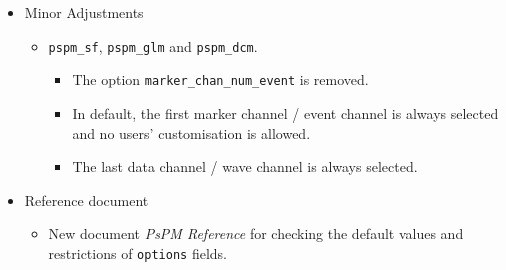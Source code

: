 \documentclass[english]{article}
\numberwithin{equation}{section}
\numberwithin{figure}{section}
\begin{document}
\begin{itemize}
    \item Minor Adjustments
    \begin{itemize}
    	\item \texttt{pspm\_sf}, \texttt{pspm\_glm} and \texttt{pspm\_dcm}.
    	\begin{itemize}
    		\item The option \texttt{marker\_chan\_num\_event} is removed.
    		\item In default, the first marker channel / event channel is always selected and no users' customisation is allowed.
    		\item The last data channel / wave channel is always selected.
    	\end{itemize}
    \end{itemize}
    \item Reference document
    \begin{itemize}
    	\item New document \textit{PsPM Reference} for checking the default values and restrictions of \texttt{options} fields.
    \end{itemize}
\end{itemize}



\end{document}
